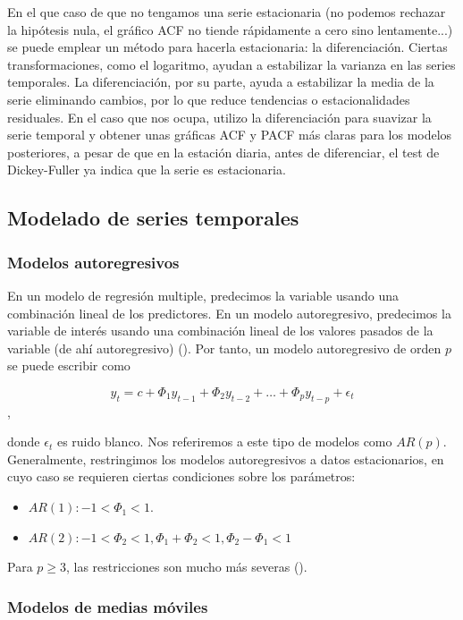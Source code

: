 En el que caso de que no tengamos una serie estacionaria (no podemos rechazar la hipótesis nula, el gráfico ACF no tiende rápidamente a cero sino lentamente...) se puede emplear un método para hacerla estacionaria: la diferenciación. Ciertas transformaciones, como el logaritmo, ayudan a estabilizar la varianza en las series temporales. La diferenciación, por su parte, ayuda a estabilizar la media de la serie eliminando cambios, por lo que reduce tendencias o estacionalidades residuales. En el caso que nos ocupa, utilizo la diferenciación para suavizar la serie temporal y obtener unas gráficas ACF y PACF más claras para los modelos posteriores, a pesar de que en la estación diaria, antes de diferenciar, el test de Dickey-Fuller ya indica que la serie es estacionaria. 

\subsection{Modelado de series temporales}

\subsubsection{Modelos autoregresivos}

En un modelo de regresión multiple, predecimos la variable usando una combinación lineal de los predictores. En un modelo autoregresivo, predecimos la variable de interés usando una combinación lineal de los valores pasados de la variable (de ahí autoregresivo) (\cite{hyndman}). Por tanto, un modelo autoregresivo de orden $p$ se puede escribir como

$$y_t = c + \Phi_1 y_{t-1}+ \Phi_2 y_{t-2}+\dots+\Phi_p y_{t-p}+ \epsilon_t$$,

donde $\epsilon_t$ es ruido blanco. Nos referiremos a este tipo de modelos como $AR(p)$. Generalmente, restringimos los modelos autoregresivos a datos estacionarios, en cuyo caso se requieren ciertas condiciones sobre los parámetros:
\begin{itemize}
	\item $AR(1): -1 < \Phi_1 <1$.
	\item $AR(2): -1 < \Phi_2 <1, \Phi_1 +\Phi_2 < 1, \Phi_2-\Phi_1<1$
\end{itemize}

Para $p\geq 3$, las restricciones son mucho más severas (\cite{hyndman}).

\subsubsection{Modelos de medias móviles}

